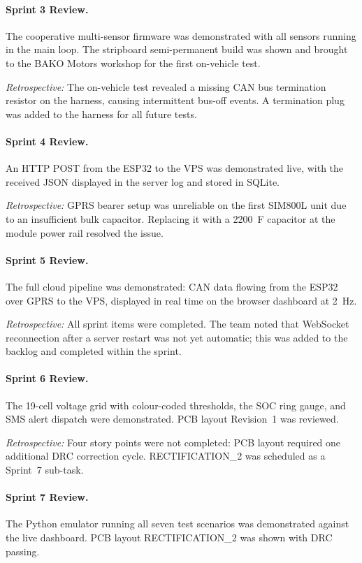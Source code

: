 \paragraph{Sprint 3 Review.} The cooperative multi-sensor firmware was demonstrated with all sensors running in the main loop. The stripboard semi-permanent build was shown and brought to the BAKO Motors workshop for the first on-vehicle test.

\textit{Retrospective:} The on-vehicle test revealed a missing CAN bus termination resistor on the harness, causing intermittent bus-off events. A termination plug was added to the harness for all future tests.

\paragraph{Sprint 4 Review.} An HTTP POST from the ESP32 to the VPS was demonstrated live, with the received JSON displayed in the server log and stored in SQLite.

\textit{Retrospective:} GPRS bearer setup was unreliable on the first SIM800L unit due to an insufficient bulk capacitor. Replacing it with a 2200~\textmu{}F capacitor at the module power rail resolved the issue.

\paragraph{Sprint 5 Review.} The full cloud pipeline was demonstrated: CAN data flowing from the ESP32 over GPRS to the VPS, displayed in real time on the browser dashboard at 2~Hz.

\textit{Retrospective:} All sprint items were completed. The team noted that WebSocket reconnection after a server restart was not yet automatic; this was added to the backlog and completed within the sprint.

\paragraph{Sprint 6 Review.} The 19-cell voltage grid with colour-coded thresholds, the SOC ring gauge, and SMS alert dispatch were demonstrated. PCB layout Revision~1 was reviewed.

\textit{Retrospective:} Four story points were not completed: PCB layout required one additional DRC correction cycle. RECTIFICATION\_2 was scheduled as a Sprint~7 sub-task.

\paragraph{Sprint 7 Review.} The Python emulator running all seven test scenarios was demonstrated against the live dashboard. PCB layout RECTIFICATION\_2 was shown with DRC passing.

